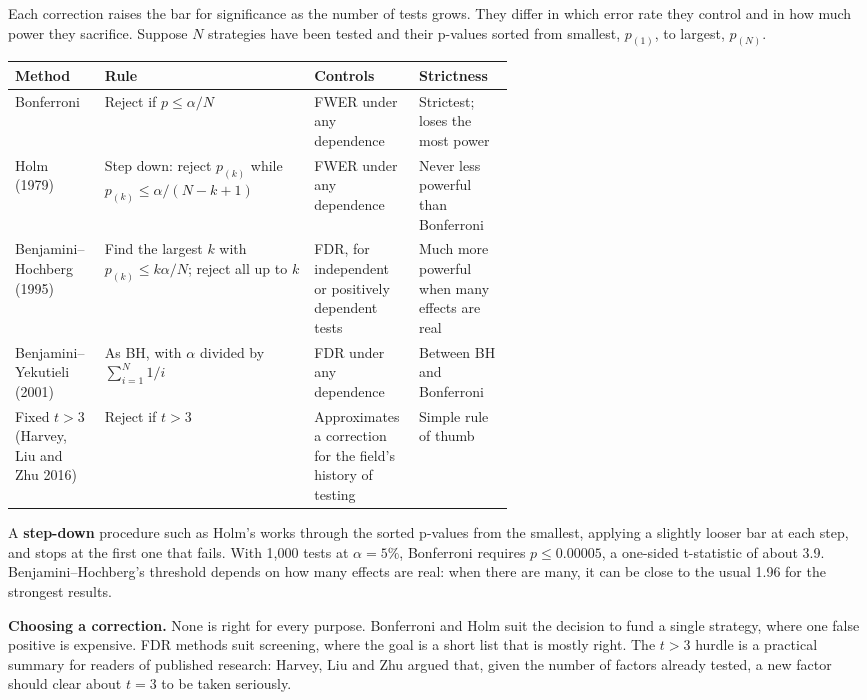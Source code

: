 Each correction raises the bar for significance as the number of tests grows. They differ in which error rate they control and in how much power they sacrifice. Suppose $N$ strategies have been tested and their p-values sorted from smallest, $p_{(1)}$, to largest, $p_{(N)}$.

\begin{center}
\small
\begin{tabularx}{0.9\linewidth}{@{}>{\raggedright\arraybackslash}p{0.18\linewidth}>{\raggedright\arraybackslash}X>{\raggedright\arraybackslash}p{0.21\linewidth}>{\raggedright\arraybackslash}p{0.19\linewidth}@{}}
\toprule
Method & Rule & Controls & Strictness \\
\midrule
Bonferroni & Reject if $p \le \alpha/N$ & FWER under any dependence & Strictest; loses the most power \\
Holm (1979) & Step down: reject $p_{(k)}$ while $p_{(k)} \le \alpha/(N - k + 1)$ & FWER under any dependence & Never less powerful than Bonferroni \\
Benjamini--Hochberg (1995) & Find the largest $k$ with $p_{(k)} \le k\alpha/N$; reject all up to $k$ & FDR, for independent or positively dependent tests & Much more powerful when many effects are real \\
Benjamini--Yekutieli (2001) & As BH, with $\alpha$ divided by $\sum_{i=1}^{N} 1/i$ & FDR under any dependence & Between BH and Bonferroni \\
Fixed $t > 3$ (Harvey, Liu and Zhu 2016) & Reject if $t > 3$ & Approximates a correction for the field's history of testing & Simple rule of thumb \\
\bottomrule
\end{tabularx}
\end{center}

A \textbf{step-down} procedure such as Holm's works through the sorted p-values from the smallest, applying a slightly looser bar at each step, and stops at the first one that fails. With 1,000 tests at $\alpha = 5\%$, Bonferroni requires $p \le 0.00005$, a one-sided t-statistic of about 3.9. Benjamini--Hochberg's threshold depends on how many effects are real: when there are many, it can be close to the usual 1.96 for the strongest results.

\textbf{Choosing a correction.} None is right for every purpose. Bonferroni and Holm suit the decision to fund a single strategy, where one false positive is expensive. FDR methods suit screening, where the goal is a short list that is mostly right. The $t > 3$ hurdle is a practical summary for readers of published research: Harvey, Liu and Zhu argued that, given the number of factors already tested, a new factor should clear about $t = 3$ to be taken seriously.

